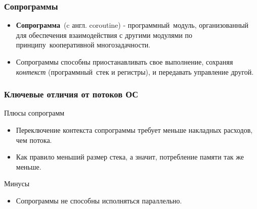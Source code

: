 \begin{frame}
	\frametitle{Сопрограммы}
	\begin{itemize}
		\item \textbf{Сопрограмма} (c англ. coroutine) - программный модуль, организованный для обеспечения взаимодействия с другими модулями по принципу кооперативной многозадачности.
		
		\item Сопрограммы способны приостанавливать свое выполнение, сохраняя \textit{контекст} (программный стек и регистры), и передавать управление другой.
	\end{itemize}
\end{frame}

\begin{frame}
	\frametitle{Ключевые отличия от потоков ОС}
	Плюсы сопрограмм
	\begin{itemize}
		\item Переключение контекста сопрограммы требует меньше накладных расходов, чем потока.
		\item Как правило меньший размер стека, а значит, потребление памяти так же меньше.
	\end{itemize}

	Минусы
	\begin{itemize}
		\item Сопрограммы не способны исполняться параллельно.
	\end{itemize}
\end{frame}

